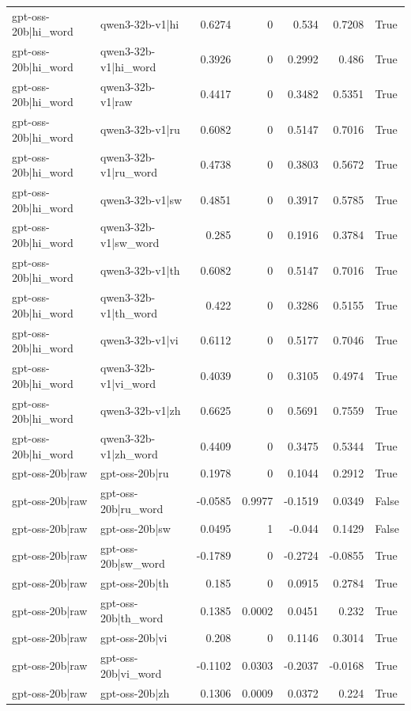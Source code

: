 \begin{table}
\begin{tabular}{l l r r r r l}
gpt-oss-20b|hi_word & qwen3-32b-v1|hi & 0.6274 & 0 & 0.534 & 0.7208 & True \\
gpt-oss-20b|hi_word & qwen3-32b-v1|hi_word & 0.3926 & 0 & 0.2992 & 0.486 & True \\
gpt-oss-20b|hi_word & qwen3-32b-v1|raw & 0.4417 & 0 & 0.3482 & 0.5351 & True \\
gpt-oss-20b|hi_word & qwen3-32b-v1|ru & 0.6082 & 0 & 0.5147 & 0.7016 & True \\
gpt-oss-20b|hi_word & qwen3-32b-v1|ru_word & 0.4738 & 0 & 0.3803 & 0.5672 & True \\
gpt-oss-20b|hi_word & qwen3-32b-v1|sw & 0.4851 & 0 & 0.3917 & 0.5785 & True \\
gpt-oss-20b|hi_word & qwen3-32b-v1|sw_word & 0.285 & 0 & 0.1916 & 0.3784 & True \\
gpt-oss-20b|hi_word & qwen3-32b-v1|th & 0.6082 & 0 & 0.5147 & 0.7016 & True \\
gpt-oss-20b|hi_word & qwen3-32b-v1|th_word & 0.422 & 0 & 0.3286 & 0.5155 & True \\
gpt-oss-20b|hi_word & qwen3-32b-v1|vi & 0.6112 & 0 & 0.5177 & 0.7046 & True \\
gpt-oss-20b|hi_word & qwen3-32b-v1|vi_word & 0.4039 & 0 & 0.3105 & 0.4974 & True \\
gpt-oss-20b|hi_word & qwen3-32b-v1|zh & 0.6625 & 0 & 0.5691 & 0.7559 & True \\
gpt-oss-20b|hi_word & qwen3-32b-v1|zh_word & 0.4409 & 0 & 0.3475 & 0.5344 & True \\
gpt-oss-20b|raw & gpt-oss-20b|ru & 0.1978 & 0 & 0.1044 & 0.2912 & True \\
gpt-oss-20b|raw & gpt-oss-20b|ru_word & -0.0585 & 0.9977 & -0.1519 & 0.0349 & False \\
gpt-oss-20b|raw & gpt-oss-20b|sw & 0.0495 & 1 & -0.044 & 0.1429 & False \\
gpt-oss-20b|raw & gpt-oss-20b|sw_word & -0.1789 & 0 & -0.2724 & -0.0855 & True \\
gpt-oss-20b|raw & gpt-oss-20b|th & 0.185 & 0 & 0.0915 & 0.2784 & True \\
gpt-oss-20b|raw & gpt-oss-20b|th_word & 0.1385 & 0.0002 & 0.0451 & 0.232 & True \\
gpt-oss-20b|raw & gpt-oss-20b|vi & 0.208 & 0 & 0.1146 & 0.3014 & True \\
gpt-oss-20b|raw & gpt-oss-20b|vi_word & -0.1102 & 0.0303 & -0.2037 & -0.0168 & True \\
gpt-oss-20b|raw & gpt-oss-20b|zh & 0.1306 & 0.0009 & 0.0372 & 0.224 & True \\

\end{tabular}
\end{table}
